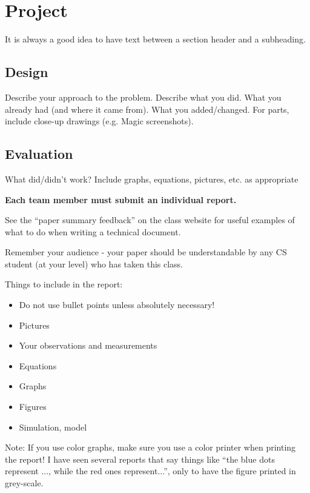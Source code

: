 \documentclass[final]{ieee}
\begin{document}
\section{Project}

It is always a good idea to have text between a section header and
a subheading.

\subsection{Design}

Describe your approach to the problem.
Describe what you did.
            What you already had (and where it came from).
            What you added/changed.
            For parts, include close-up drawings (e.g. Magic screenshots).
\subsection{Evaluation}
          What did/didn't work?
          Include graphs, equations, pictures, etc. as appropriate


{\bf Each team member must submit an individual report.}

See the ``paper summary feedback'' on the class website for
useful examples of what to do when writing a technical document.


Remember your audience - your paper should be understandable by any CS
student (at your level) who has taken this class.

Things to include in the report:
\begin{itemize}
    \item Do not use bullet points unless absolutely necessary!
    \item Pictures
    \item Your observations and measurements
    \item  Equations
    \item Graphs
    \item Figures
    \item Simulation, model 
\end{itemize}

Note: If you use color graphs, make sure you use a color printer when
printing the report! I have seen several reports that say things like
``the blue dots represent ..., while the red ones represent...'', only to
have the figure printed in grey-scale.


\end{document}
